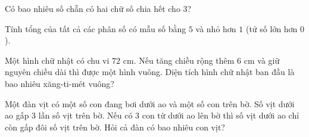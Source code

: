 \begin{ex}
  Có bao nhiêu số chẵn có hai chữ số chia hết cho $3$?
\end{ex}

\begin{ex}
  Tính tổng của tất cả các phân số có mẫu số bằng $5$ và nhỏ hơn $1$ (tử số lớn hơn $0$).
\end{ex}

\begin{ex}
  Một hình chữ nhật có chu vi $72\text{ cm}$. Nếu tăng chiều rộng thêm $6\text{ cm}$ và giữ nguyên chiều dài thì được một hình vuông. Diện tích hình chữ nhật ban đầu là bao nhiêu xăng-ti-mét vuông?
\end{ex}

\begin{ex}
  Một đàn vịt có một số con đang bơi dưới ao và một số con trên bờ. Số vịt dưới ao gấp 3 lần số vịt trên bờ. Nếu có 3 con từ dưới ao lên bờ thì số vịt dưới ao chỉ còn gấp đôi số vịt trên bờ. Hỏi cả đàn có bao nhiêu con vịt?
\end{ex}
